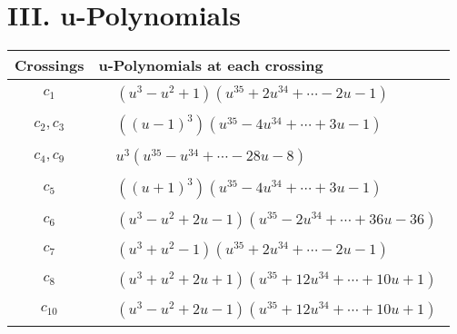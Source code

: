\documentclass[1p]{elsarticle_modified}
\theoremstyle{definition}
\begin{document}
\newpage\renewcommand{\arraystretch}{1}
\centering \section*{ III. u-Polynomials}
\begin{tabular}{m{50pt}|m{274pt}}
Crossings & \hspace{64pt}u-Polynomials at each crossing \\
\hline $$\begin{aligned}c_{1}\end{aligned}$$&$\begin{aligned}
&(u^3- u^2+1)(u^{35}+2 u^{34}+\cdots-2 u-1)
\end{aligned}$\\
\hline $$\begin{aligned}c_{2},c_{3}\end{aligned}$$&$\begin{aligned}
&((u-1)^3)(u^{35}-4 u^{34}+\cdots+3 u-1)
\end{aligned}$\\
\hline $$\begin{aligned}c_{4},c_{9}\end{aligned}$$&$\begin{aligned}
&u^3(u^{35}- u^{34}+\cdots-28 u-8)
\end{aligned}$\\
\hline $$\begin{aligned}c_{5}\end{aligned}$$&$\begin{aligned}
&((u+1)^3)(u^{35}-4 u^{34}+\cdots+3 u-1)
\end{aligned}$\\
\hline $$\begin{aligned}c_{6}\end{aligned}$$&$\begin{aligned}
&(u^3- u^2+2 u-1)(u^{35}-2 u^{34}+\cdots+36 u-36)
\end{aligned}$\\
\hline $$\begin{aligned}c_{7}\end{aligned}$$&$\begin{aligned}
&(u^3+u^2-1)(u^{35}+2 u^{34}+\cdots-2 u-1)
\end{aligned}$\\
\hline $$\begin{aligned}c_{8}\end{aligned}$$&$\begin{aligned}
&(u^3+u^2+2 u+1)(u^{35}+12 u^{34}+\cdots+10 u+1)
\end{aligned}$\\
\hline $$\begin{aligned}c_{10}\end{aligned}$$&$\begin{aligned}
&(u^3- u^2+2 u-1)(u^{35}+12 u^{34}+\cdots+10 u+1)
\end{aligned}$\\
\hline
\end{tabular}\newpage\renewcommand{\arraystretch}{1}
\end{document}
